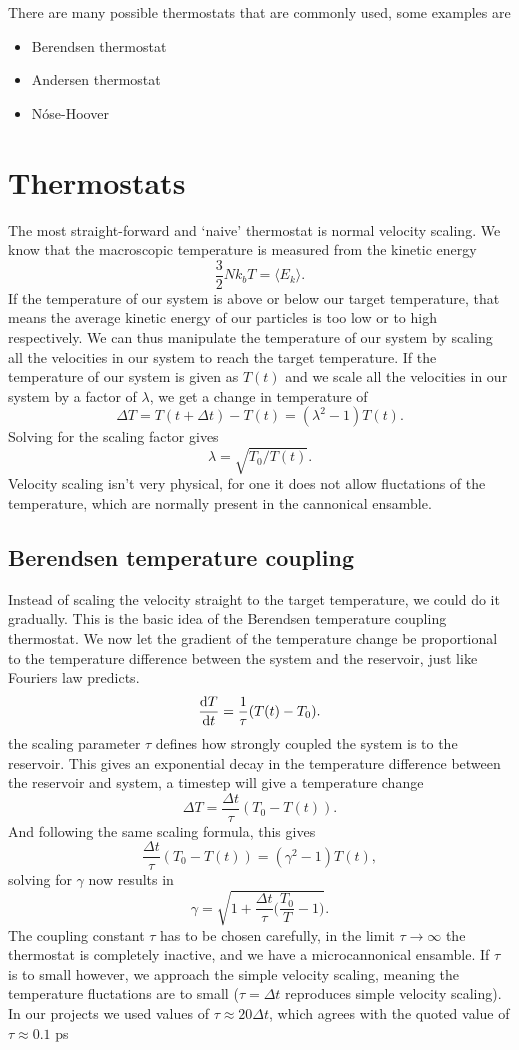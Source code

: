 \documentclass[a4paper, 11pt, notitlepage, english]{article}
\renewcommand{\d}{{\rm d}}
\renewcommand{\b}{\bigg}
\begin{document}
There are many possible thermostats that are commonly used, some examples are
\begin{itemize}
	\item Berendsen thermostat
	\item Andersen thermostat
	\item Nóse-Hoover
\end{itemize}



\section*{Thermostats}

The most straight-forward and `naive' thermostat is normal velocity scaling. We know that the macroscopic temperature is measured from the kinetic energy
$$\frac{3}{2}N k_b T = \langle E_k \rangle.$$
If the temperature of our system is above or below our target temperature, that means the average kinetic energy of our particles is too low or to high respectively. We can thus manipulate the temperature of our system by scaling all the velocities in our system to reach the target temperature. If the temperature of our system is given as $T(t)$ and we scale all the velocities in our system by a factor of $\lambda$, we get a change in temperature of
$$\Delta T = T(t+\Delta t) - T(t) = (\lambda^2 - 1)T(t).$$
Solving for the scaling factor gives
$$\lambda = \sqrt{T_0/T(t)}.$$
Velocity scaling isn't very physical, for one it does not allow fluctations of the temperature, which are normally present in the cannonical ensamble.

\subsection*{Berendsen temperature coupling}

Instead of scaling the velocity straight to the target temperature, we could do it gradually. This is the basic idea of the Berendsen temperature coupling thermostat. We now let the gradient of the temperature change be proportional to the temperature difference between the system and the reservoir, just like Fouriers law predicts. 
$$\frac{\d T}{\d t} = \frac{1}{\tau}(T(t) - T_0).$$
the scaling parameter $\tau$ defines how strongly coupled the system is to the reservoir. This gives an exponential decay in the temperature difference between the reservoir and system, a timestep will give a temperature change
$$\Delta T = \frac{\Delta t}{\tau}(T_0 - T(t)).$$
And following the same scaling formula, this gives
$$\frac{\Delta t}{\tau}(T_0 - T(t)) = (\gamma^2 - 1)T(t),$$
solving for $\gamma$ now results in
$$\gamma = \sqrt{1 + \frac{\Delta t}{\tau}\b(\frac{T_0}{T} - 1\b)}.$$
The coupling constant $\tau$ has to be chosen carefully, in the limit $\tau \to \infty$ the thermostat is completely inactive, and we have a microcannonical ensamble. If $\tau$ is to small however, we approach the simple velocity scaling, meaning the temperature fluctations are to small ($\tau = \Delta t$ reproduces simple velocity scaling). In our projects we used values of $\tau \approx 20 \Delta t$, which agrees with the quoted value of $\tau \approx 0.1$ ps
\end{document}

